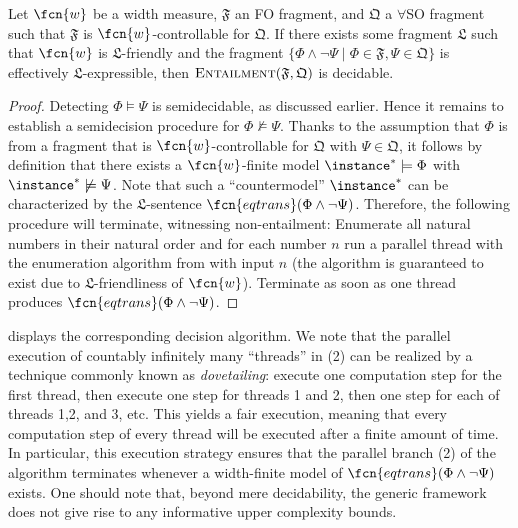 \begin{theorem}\label{thm:decidablequerying}
Let $\fcn{w}$ be a width measure,
$\mathfrak{F}$ an FO fragment, and 
$\mathfrak{Q}$ a $\forall$SO fragment 
such that $\mathfrak{F}$ is $\fcn{w}$-controllable for $\mathfrak{Q}$.
If there exists some fragment $\mathfrak{L}$ such that $\fcn{w}$ is $\mathfrak{L}$-friendly
and the fragment $\{\Phi \wedge \neg \Psi \mid \Phi \in \mathfrak{F}, \Psi \in \mathfrak{Q}\}$ is effectively 
$\mathfrak{L}$-expressible, then $\textsc{Entailment}(\mathfrak{F},\mathfrak{Q})$ is decidable.
\end{theorem}



\begin{proof}
Detecting $\Phi \models \Psi$ is semidecidable, as discussed earlier.
Hence it remains to establish a semidecision procedure for $\Phi \not\models \Psi$. 
Thanks to the assumption that $\Phi$ is from a fragment that is $\fcn{w}$-controllable for $\mathfrak{Q}$ with $\Psi \in \mathfrak{Q}$, it follows by definition that there exists a $\fcn{w}$-finite model $\instance^* \models \Phi$ with $\instance^* \not\models \Psi$.
Note that such a ``countermodel'' $\instance^*$ can be characterized by the $\mathfrak{L}$-sentence $\fcn{eqtrans}(\Phi \wedge \neg\Psi)$.  %
 Therefore, the following procedure will terminate, witnessing non-entailment: Enumerate all natural numbers in their natural order and for each number $n$ run a parallel thread with the enumeration algorithm from  with input $n$ (the algorithm is guaranteed to exist due to $\mathfrak{L}$-friendliness of $\fcn{w}$). Terminate as soon as one thread produces $\fcn{eqtrans}(\Phi \wedge \neg\Psi)$.\qedhere
\end{proof}

 displays the corresponding decision algorithm. We note that the parallel execution of countably infinitely many ``threads'' in (2) can be realized by a technique commonly known as \emph{dovetailing}: execute one computation step for the first thread, then execute one step for threads 1 and 2, then one step for each of threads 1,2, and 3, etc. This yields a fair execution, meaning that every computation step of every thread will be executed after a finite amount of time. In particular, this execution strategy ensures that the parallel branch (2) of the algorithm terminates whenever a width-finite model of $\fcn{eqtrans}(\Phi \wedge \neg\Psi)$ exists. One should note that, beyond mere decidability, the generic framework does not give rise to any informative upper complexity bounds.

